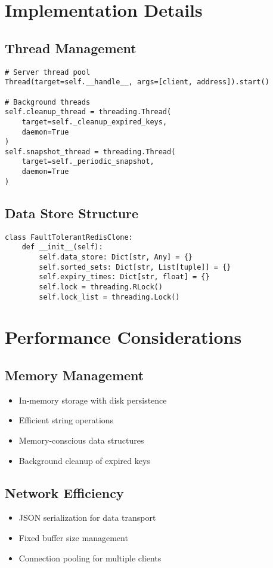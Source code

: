 \documentclass[11pt]{article}
\begin{document}
\section{Implementation Details}

\subsection{Thread Management}
\begin{lstlisting}
# Server thread pool
Thread(target=self.__handle__, args=[client, address]).start()

# Background threads
self.cleanup_thread = threading.Thread(
    target=self._cleanup_expired_keys, 
    daemon=True
)
self.snapshot_thread = threading.Thread(
    target=self._periodic_snapshot, 
    daemon=True
)
\end{lstlisting}

\subsection{Data Store Structure}
\begin{lstlisting}
class FaultTolerantRedisClone:
    def __init__(self):
        self.data_store: Dict[str, Any] = {}
        self.sorted_sets: Dict[str, List[tuple]] = {} 
        self.expiry_times: Dict[str, float] = {} 
        self.lock = threading.RLock()
        self.lock_list = threading.Lock()
\end{lstlisting}

\section{Performance Considerations}

\subsection{Memory Management}
\begin{itemize}
    \item In-memory storage with disk persistence
    \item Efficient string operations
    \item Memory-conscious data structures
    \item Background cleanup of expired keys
\end{itemize}

\subsection{Network Efficiency}
\begin{itemize}
    \item JSON serialization for data transport
    \item Fixed buffer size management
    \item Connection pooling for multiple clients
\end{itemize}
\end{document}
